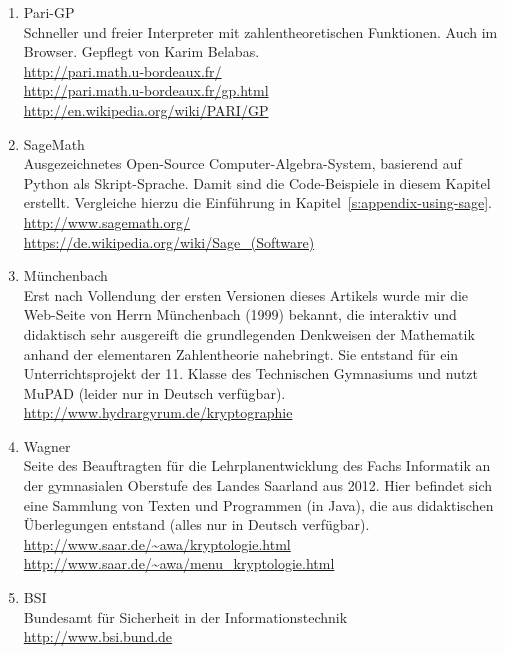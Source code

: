 \begin{refsegment}
\begin{enumerate}
   \item Pari-GP \\
         Schneller und freier Interpreter mit zahlentheoretischen Funktionen.
	 Auch im Browser. Gepflegt von Karim Belabas.\\
         \url{http://pari.math.u-bordeaux.fr/}\\%
         \url{http://pari.math.u-bordeaux.fr/gp.html}\\
         \url{http://en.wikipedia.org/wiki/PARI/GP}

   \item\sloppy SageMath\\
         Ausgezeichnetes Open-Source Computer-Algebra-System, basierend auf Python
	 als Skript-Sprache. Damit sind die Code-Beispiele in diesem Kapitel erstellt.
	 Vergleiche hierzu die Einführung in Kapitel~\ref{s:appendix-using-sage}.\\
         \url{http://www.sagemath.org/}\\
         \url{https://de.wikipedia.org/wiki/Sage_(Software)}

   \item Münchenbach\\
         Erst nach Vollendung der ersten Versionen dieses Artikels wurde mir die Web-Seite von
	 Herrn Münchenbach (1999) bekannt, die interaktiv und didaktisch sehr
         ausgereift die grundlegenden Denkweisen der Mathematik anhand
         der elementaren Zahlentheorie nahebringt. Sie entstand für
         ein Unterrichtsprojekt der 11. Klasse des Technischen Gymnasiums
         und nutzt MuPAD (leider nur in Deutsch verfügbar).\\
         \url{http://www.hydrargyrum.de/kryptographie}

   \item Wagner\\
	 Seite des Beauftragten für die Lehrplanentwicklung des Fachs
         Informatik an der gymnasialen Oberstufe des Landes Saarland aus 2012.
         Hier befindet sich eine Sammlung von Texten und Programmen
         (in Java), die aus didaktischen Überlegungen entstand (alles
         nur in Deutsch verfügbar).\\
         \url{http://www.saar.de/~awa/kryptologie.html}\\
         \url{http://www.saar.de/~awa/menu_kryptologie.html}

   \item BSI\\
         Bundesamt für Sicherheit in der Informationstechnik\\
         \url{http://www.bsi.bund.de}



\end{enumerate}
\end{refsegment}
